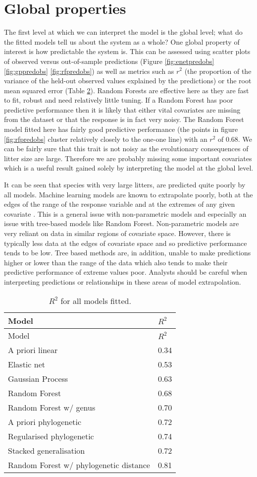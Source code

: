 \documentclass[12pt,]{article}
\begin{document}
\section{Global properties}\label{global-properties}

The first level at which we can interpret the model is the global level; what do the fitted models tell us about the system as a whole?
One global property of interest is how predictable the system is.
This can be assessed using scatter plots of observed versus out-of-sample predictions (Figure \ref{fig:enetpredobs} \ref{fig:gppredobs} \ref{fig:rfpredobs}) as well as metrics such as  \(r^2\) (the proportion of the variance of the held-out observed values explained by the predictions) or the root mean squared error (Table \ref{tbl:allr2}).
Random Forests are effective here as they are fast to fit, robust and need relatively little tuning.
If a Random Forest has poor predictive performance then it is likely that either vital covariates are missing from the dataset or that the response is in fact very noisy.
The Random Forest model fitted here has fairly good predictive performance (the points in figure \ref{fig:rfpredobs} cluster relatively closely to the one-one line) with an \(r^2\) of 0.68.
We can be fairly sure that this trait is not noisy as the evolutionary consequences of litter size are large.
Therefore we are probably missing some important covariates which is a useful result gained solely by interpreting the model at the global level.

It can be seen that species with very large litters, are predicted quite poorly by all models.
Machine learning models are known to extrapolate poorly, both at the edges of the range of the response variable and at the extremes of any given covariate \citep{elith2010art}.
This is a general issue with non-parametric models and especially an issue with tree-based models like Random Forest.
Non-parametric models are very reliant on data in similar regions of covariate space.
However, there is typically less data at the edges of covariate space and so predictive performance tends to be low.
Tree based methods are, in addition, unable to make predictions higher or lower than the range of the data which also tends to make their predictive performance of extreme values poor.
Analysts should be careful when interpreting predictions or relationships in these areas of model extrapolation. 

\begin{table}[t!]
\begin{longtable}[c]{@{}ll@{}}
\caption{\(R^2\) for all models fitted. \label{tbl:allr2}}\tabularnewline
\toprule
Model & \(R^2\)\tabularnewline
\midrule
\endfirsthead
\toprule
Model & \(R^2\)\tabularnewline
\midrule
\endhead
A priori linear & 0.34\tabularnewline
Elastic net & 0.53\tabularnewline
Gaussian Process & 0.63\tabularnewline
Random Forest & 0.68\tabularnewline
Random Forest w/ genus & 0.70\tabularnewline
A priori phylogenetic & 0.72\tabularnewline
Regularised phylogenetic & 0.74\tabularnewline
Stacked generalisation & 0.72\tabularnewline
Random Forest w/ phylogenetic distance & 0.81\tabularnewline
\bottomrule
\end{longtable}
\end{table}
\end{document}
